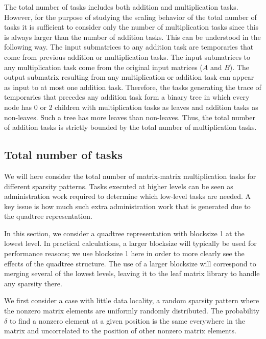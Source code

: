 \documentclass{elsarticle}
\begin{document}
The total number of tasks includes both addition and multiplication
tasks. However, for the purpose of studying the scaling behavior of
the total number of tasks it is sufficient to consider only the number
of multiplication tasks since this is always larger than the number of
addition tasks. This can be understood in the following way. The input
submatrices to any addition task are temporaries that come from
previous addition or multiplication tasks. The input submatrices to
any multiplication task come from the original input matrices ($A$ and
$B$). The output submatrix resulting from any multiplication or
addition task can appear as input to at most one addition task.
Therefore, the tasks generating the trace of temporaries that precedes
any addition task form a binary tree in which every node has 0 or 2
children with multiplication tasks as leaves and addition tasks as
non-leaves.  Such a tree has more leaves than non-leaves.  Thus, the
total number of addition tasks is strictly bounded by the total number
of multiplication tasks.

\subsection{Total number of tasks}
We will here consider the total number of matrix-matrix multiplication
tasks for different sparsity patterns. Tasks executed at higher levels
can be seen as administration work required to determine which
low-level tasks are needed. A key issue is how much such extra
administration work that is generated due to the quadtree
representation.


In this section, we consider a quadtree representation with blocksize 1
at the lowest level. In practical calculations, a larger blocksize will
typically be used for performance reasons; we use blocksize 1 here in
order to more clearly see the effects of the quadtree structure. The
use of a larger blocksize will correspond to merging several of the
lowest levels, leaving it to the leaf matrix library to handle any sparsity there.

We first consider a case with little data locality, a random sparsity
pattern where the nonzero matrix elements are uniformly randomly
distributed. The probability $\delta$ to find a nonzero element at a given
position is the same everywhere in the matrix and uncorrelated to the
position of other nonzero matrix elements.
\end{document}

